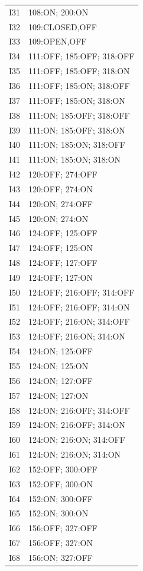 {\begin{longtable}{lp{.85\linewidth}}
I31 & 108:ON; 200:ON \\
I32 & 109:CLOSED,OFF \\
I33 & 109:OPEN,OFF \\
I34 & 111:OFF; 185:OFF; 318:OFF \\
I35 & 111:OFF; 185:OFF; 318:ON \\
I36 & 111:OFF; 185:ON; 318:OFF \\
I37 & 111:OFF; 185:ON; 318:ON \\
I38 & 111:ON; 185:OFF; 318:OFF \\
I39 & 111:ON; 185:OFF; 318:ON \\
I40 & 111:ON; 185:ON; 318:OFF \\
I41 & 111:ON; 185:ON; 318:ON \\
I42 & 120:OFF; 274:OFF \\
I43 & 120:OFF; 274:ON \\
I44 & 120:ON; 274:OFF \\
I45 & 120:ON; 274:ON \\
I46 & 124:OFF; 125:OFF \\
I47 & 124:OFF; 125:ON \\
I48 & 124:OFF; 127:OFF \\
I49 & 124:OFF; 127:ON \\
I50 & 124:OFF; 216:OFF; 314:OFF \\
I51 & 124:OFF; 216:OFF; 314:ON \\
I52 & 124:OFF; 216:ON; 314:OFF \\
I53 & 124:OFF; 216:ON; 314:ON \\
I54 & 124:ON; 125:OFF \\
I55 & 124:ON; 125:ON \\
I56 & 124:ON; 127:OFF \\
I57 & 124:ON; 127:ON \\
I58 & 124:ON; 216:OFF; 314:OFF \\
I59 & 124:ON; 216:OFF; 314:ON \\
I60 & 124:ON; 216:ON; 314:OFF \\
I61 & 124:ON; 216:ON; 314:ON \\
I62 & 152:OFF; 300:OFF \\
I63 & 152:OFF; 300:ON \\
I64 & 152:ON; 300:OFF \\
I65 & 152:ON; 300:ON \\
I66 & 156:OFF; 327:OFF \\
I67 & 156:OFF; 327:ON \\
I68 & 156:ON; 327:OFF \\

\end{longtable}}
